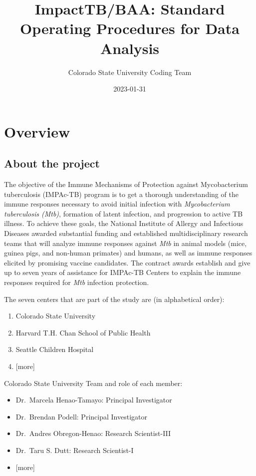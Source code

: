 \documentclass[
]{book}
\title{ImpactTB/BAA: Standard Operating Procedures for Data Analysis}
\author{Colorado State University Coding Team}
\date{2023-01-31}
\providecommand{\tightlist}{%
  \setlength{\itemsep}{0pt}\setlength{\parskip}{0pt}}
\begin{document}
\maketitle

{
\setcounter{tocdepth}{1}
\tableofcontents
}
\hypertarget{overview}{%
\chapter{Overview}\label{overview}}

\hypertarget{about-the-project}{%
\section{About the project}\label{about-the-project}}

The objective of the Immune Mechanisms of Protection against Mycobacterium tuberculosis (IMPAc-TB) program is to get a thorough understanding of the immune responses necessary to avoid initial infection with \emph{Mycobacterium tuberculosis (Mtb)}, formation of latent infection, and progression to active TB illness. To achieve these goals, the National Institute of Allergy and Infectious Diseases awarded substantial funding and established multidisciplinary research teams that will analyze immune responses against \emph{Mtb} in animal models (mice, guinea pigs, and non-human primates) and humans, as well as immune responses elicited by promising vaccine candidates. The contract awards establish and give up to seven years of assistance for IMPAc-TB Centers to explain the immune responses required for \emph{Mtb} infection protection.

The seven centers that are part of the study are (in alphabetical order):

\begin{enumerate}
\def\labelenumi{\arabic{enumi}.}
\tightlist
\item
  Colorado State University
\item
  Harvard T.H. Chan School of Public Health
\item
  Seattle Children Hospital
\item
  {[}more{]}
\end{enumerate}

Colorado State University Team and role of each member:

\begin{itemize}
\tightlist
\item
  Dr.~Marcela Henao-Tamayo: Principal Investigator
\item
  Dr.~Brendan Podell: Principal Investigator
\item
  Dr.~Andres Obregon-Henao: Research Scientist-III
\item
  Dr.~Taru S. Dutt: Research Scientist-I
\item
  {[}more{]}
\end{itemize}
\end{document}
